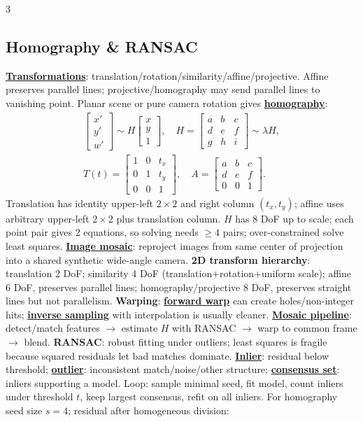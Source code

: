 \documentclass{article}
\numberwithin{equation}{subsection}
\newcommand{\key}[1]{\textbf{#1}}
\newcommand{\lowterm}[1]{\textbf{\underline{#1}}}
\begin{document}
\begin{multicols*}{3}
\subsection{Homography \& RANSAC}
\lowterm{Transformations}: translation/rotation/similarity/affine/projective. Affine preserves parallel lines; projective/homography may send parallel lines to vanishing point. Planar scene or pure camera rotation gives \lowterm{homography}:
\[
\begin{gathered}
\begin{bmatrix}x'\\y'\\w'\end{bmatrix}\sim
H\begin{bmatrix}x\\y\\1\end{bmatrix},\quad
H=\begin{bmatrix}a&b&c\\d&e&f\\g&h&i\end{bmatrix}\sim\lambda H,\\
T(t)=\begin{bmatrix}1&0&t_x\\0&1&t_y\\0&0&1\end{bmatrix},\quad
A=\begin{bmatrix}a&b&c\\d&e&f\\0&0&1\end{bmatrix}.
\end{gathered}
\]
Translation has identity upper-left $2\times2$ and right column $(t_x,t_y)$; affine uses arbitrary upper-left $2\times2$ plus translation column. $H$ has 8 DoF up to scale; each point pair gives 2 equations, so solving needs $\ge4$ pairs; over-constrained solve least squares. \lowterm{Image mosaic}: reproject images from same center of projection into a shared synthetic wide-angle camera.
\key{2D transform hierarchy}: translation 2 DoF; similarity 4 DoF (translation+rotation+uniform scale); affine 6 DoF, preserves parallel lines; homography/projective 8 DoF, preserves straight lines but not parallelism. \key{Warping}: \lowterm{forward warp} can create holes/non-integer hits; \lowterm{inverse sampling} with interpolation is usually cleaner. \lowterm{Mosaic pipeline}: detect/match features $\to$ estimate $H$ with RANSAC $\to$ warp to common frame $\to$ blend.
\key{RANSAC}: robust fitting under outliers; least squares is fragile because squared residuals let bad matches dominate. \lowterm{Inlier}: residual below threshold; \lowterm{outlier}: inconsistent match/noise/other structure; \lowterm{consensus set}: inliers supporting a model. Loop: sample minimal seed, fit model, count inliers under threshold $t$, keep largest consensus, refit on all inliers. For homography seed size $s=4$; residual after homogeneous division:

\end{multicols*}
\end{document}
